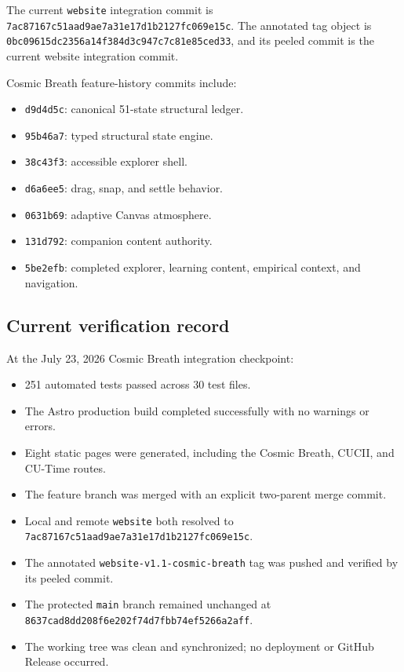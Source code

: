 \documentclass[11pt,letterpaper]{article}
\newcommand{\filepath}[1]{\nolinkurl{#1}}
\newcommand{\branchname}[1]{\texttt{#1}}
\newcommand{\release}[1]{\texttt{#1}}
\begin{document}
The current \branchname{website} integration commit is
\filepath{7ac87167c51aad9ae7a31e17d1b2127fc069e15c}. The annotated tag object is
\filepath{0bc09615dc2356a14f384d3c947c7c81e85ced33}, and its peeled commit is the
current website integration commit.

Cosmic Breath feature-history commits include:

\begin{itemize}
    \item \release{d9d4d5c}: canonical 51-state structural ledger.
    \item \release{95b46a7}: typed structural state engine.
    \item \release{38c43f3}: accessible explorer shell.
    \item \release{d6a6ee5}: drag, snap, and settle behavior.
    \item \release{0631b69}: adaptive Canvas atmosphere.
    \item \release{131d792}: companion content authority.
    \item \release{5be2efb}: completed explorer, learning content, empirical context, and navigation.
\end{itemize}

\subsection{Current verification record}

At the July 23, 2026 Cosmic Breath integration checkpoint:

\begin{itemize}
    \item 251 automated tests passed across 30 test files.
    \item The Astro production build completed successfully with no warnings or errors.
    \item Eight static pages were generated, including the Cosmic Breath, CUCII, and CU-Time routes.
    \item The feature branch was merged with an explicit two-parent merge commit.
    \item Local and remote \branchname{website} both resolved to \filepath{7ac87167c51aad9ae7a31e17d1b2127fc069e15c}.
    \item The annotated \release{website-v1.1-cosmic-breath} tag was pushed and verified by its peeled commit.
    \item The protected \branchname{main} branch remained unchanged at \filepath{8637cad8dd208f6e202f74d7fbb74ef5266a2aff}.
    \item The working tree was clean and synchronized; no deployment or GitHub Release occurred.
\end{itemize}
\end{document}
